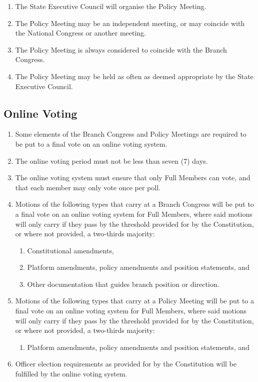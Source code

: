\documentclass[a4paper,titlepage,8.5pt]{article}
\newcommand{\stateorterritory}{State}
\begin{document}
\begin{enumerate}
\item The {\stateorterritory} Executive Council will organise the Policy Meeting.
\item The Policy Meeting may be an independent meeting, or may coincide with the National Congress or another meeting.
\item The Policy Meeting is always considered to coincide with the Branch Congress.
\item The Policy Meeting may be held as often as deemed appropriate by the {\stateorterritory} Executive Council.
\end{enumerate}

\subsection{Online Voting}

\begin{enumerate}
\item Some elements of the Branch Congress and Policy Meetings are required to be put to a final vote on an online voting system.
\item The online voting period must not be less than seven (7) days.
\item The online voting system must ensure that only Full Members can vote, and that each member may only vote once per poll.
\item Motions of the following types that carry at a Branch Congress will be put to a final vote on an online voting system for Full Members, where said motions will only carry if they pass by the threshold provided for by the Constitution, or where not provided, a two-thirds majority:
\begin{enumerate}
\item Constitutional amendments,
\item Platform amendments, policy amendments and position statements, and
\item Other documentation that guides branch position or direction.
\end{enumerate}
\item Motions of the following types that carry at a Policy Meeting will be put to a final vote on an online voting system for Full Members, where said motions will only carry if they pass by the threshold provided for by the Constitution, or where not provided, a two-thirds majority:
\begin{enumerate}
\item Platform amendments, policy amendments and position statements, and
\end{enumerate}
\item Officer election requirements as provided for by the Constitution will be fulfilled by the online voting system.
\end{enumerate}
\end{document}
